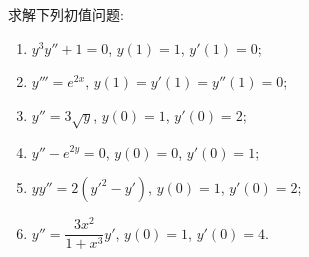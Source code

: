 \documentclass[lang=cn,11pt]{elegantbook}
\begin{document}
\begin{exercise}[求初值问题]
求解下列初值问题:
\begin{enumerate}
    \item[(1)] $y^3 y'' + 1 = 0$, $y(1)=1$, $y'(1)=0$;
    \item[(2)] $y''' = e^{2x}$, $y(1)=y'(1)=y''(1)=0$;
    \item[(3)] $y'' = 3\sqrt{y}$, $y(0)=1$, $y'(0)=2$;
    \item[(4)] $y'' - e^{2y} = 0$, $y(0)=0$, $y'(0)=1$;
    \item[(5)] $yy'' = 2(y'^2 - y')$, $y(0)=1$, $y'(0)=2$;
    \item[(6)] $y'' = \dfrac{3x^2}{1+x^3}y'$, $y(0)=1$, $y'(0)=4$.
\end{enumerate}
\end{exercise}
\end{document}
